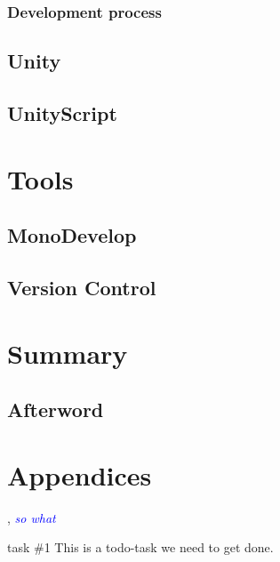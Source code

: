 \documentclass[BSP,english,oneside]{classes/gucthesis}
\newcommand{\comment}[1]{\textcolor{blue}{\emph{#1}}}
\newcommand{\todo}[1]{{\color{green}#1}}
\begin{document}
		\section{Development process}
		


	\chapter{Unity}
		\label{chap:Unity}
		


	\chapter{UnityScript}
		\label{chap:UnityScript}
		

\part{Tools}

	\chapter{MonoDevelop}
		\label{chap:MonoDevelop}
		


	\chapter{Version Control}
		\label{chap:VersionControl}
		

\part{Summary}

	\chapter{Afterword}
		\label{chap:afterword}
		






\part{Appendices}

\appendix %







\GUC, 
\comment{so what}

\todo{task \#1}
This is a todo-task we need to get done.
\end{document}
